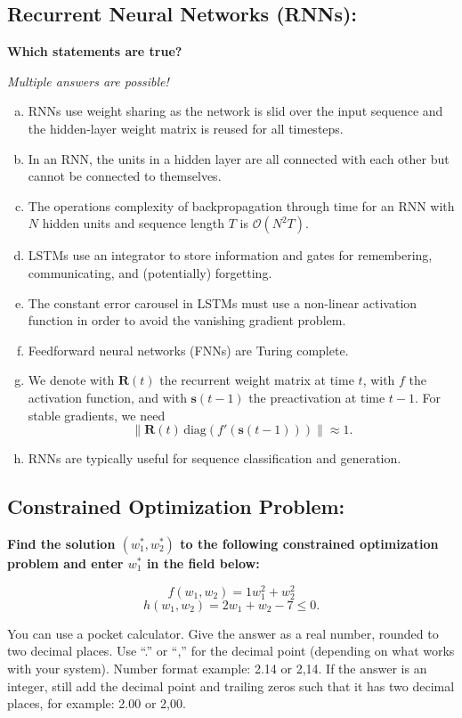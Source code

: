 \documentclass{article}
\begin{document}
\subsection*{Recurrent Neural Networks (RNNs):}

\textbf{Which statements are true?}

\textit{Multiple answers are possible!}

\begin{enumerate}[(a)]
    \item RNNs use weight sharing as the network is slid over the input sequence and the hidden-layer weight matrix is reused for all timesteps.
    \item In an RNN, the units in a hidden layer are all connected with each other but cannot be connected to themselves.
    \item The operations complexity of backpropagation through time for an RNN with \(N\) hidden units and sequence length \(T\) is \(\mathcal{O}(N^2 T)\).
    \item LSTMs use an integrator to store information and gates for remembering, communicating, and (potentially) forgetting.
    \item The constant error carousel in LSTMs must use a non-linear activation function in order to avoid the vanishing gradient problem.
    \item Feedforward neural networks (FNNs) are Turing complete.
    \item We denote with \(\mathbf{R}(t)\) the recurrent weight matrix at time \(t\), with \(f\) the activation function, and with \(\mathbf{s}(t-1)\) the preactivation at time \(t-1\). For stable gradients, we need 
    \[
    \|\mathbf{R}(t) \, \text{diag}(f'(\mathbf{s}(t-1)))\| \approx 1.
    \]
    \item RNNs are typically useful for sequence classification and generation.
\end{enumerate}

\subsection*{Constrained Optimization Problem:}

\textbf{Find the solution \((w_1^*, w_2^*)\) to the following constrained optimization problem and enter \(w_1^*\) in the field below:}

\[
f(w_1, w_2) = 1w_1^2 + w_2^2
\]
\[
h(w_1, w_2) = 2w_1 + w_2 - 7 \leq 0.
\]

You can use a pocket calculator. Give the answer as a real number, rounded to two decimal places. Use ``.'' or ``,'' for the decimal point (depending on what works with your system). Number format example: 2.14 or 2,14. If the answer is an integer, still add the decimal point and trailing zeros such that it has two decimal places, for example: 2.00 or 2,00.
\end{document}

